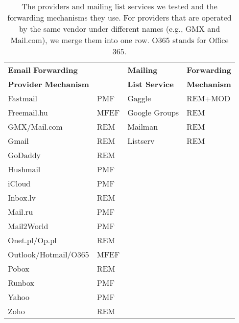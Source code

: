 \begin{table}[t]
  \centering
  \begin{tabular}{ll|ll}
  \toprule
\multicolumn{2}{l}{\textbf{Email} \hfill \hspace*{0.22in}\textbf{Forwarding}} & \textbf{Mailing} & \textbf{Forwarding} \\
\multicolumn{2}{l}{\textbf{Provider} \hfill \hspace*{0.05in}\textbf{Mechanism}} & \textbf{List Service} & \textbf{Mechanism} \\
  \midrule
  Fastmail        & PMF  & Gaggle & REM+MOD \\
  Freemail.hu     & MFEF & Google Groups & REM\\
  GMX/Mail.com    & REM  & Mailman & REM  \\
  Gmail           & REM  & Listserv & REM \\
  GoDaddy         & REM  & & \\
  Hushmail        & PMF  & & \\
  iCloud          & PMF  & & \\
  Inbox.lv        & REM  & & \\
  Mail.ru         & PMF  & & \\
  Mail2World      & PMF  & & \\
  Onet.pl/Op.pl   & REM  & & \\
  Outlook/Hotmail/O365 & MFEF & & \\
  Pobox           & REM  & & \\
  Runbox          & PMF  & & \\
  Yahoo           & PMF  & & \\
  Zoho            & REM  & & \\
  \bottomrule
  \end{tabular}
  \caption[The Providers and Mailing List Services Tested]{The providers and mailing list services we tested and the forwarding mechanisms they use. For providers that are operated by the same vendor under different names (e.g., GMX and Mail.com), we merge them into one row. O365 stands for Office 365.
    \label{tab:forwarding_mechs_in_the_wild}}
  \end{table}


